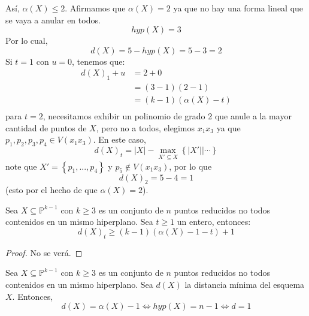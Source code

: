 \documentclass[12pt]{report}
\newcounter{it}
\theoremstyle{largebreak}
\newcommand\abs[1]{\ensuremath{\left|#1\right|}}
\begin{document}
\begin{exa}
        Así, $\alpha(X)\leq 2$. Afirmamos que $\alpha(X)=2$ ya que no hay una forma lineal que se vaya a anular en todos.
        \begin{equation*}
            hyp(X)=3
        \end{equation*}
        Por lo cual,
        \begin{equation*}
            d(X)=5-hyp(X)=5-3=2
        \end{equation*}
        Si $t=1$ con $u=0$, tenemos que:
        \begin{equation*}
            \begin{split}
                d(X)_1+u&=2+0\\
                &=(3-1)(2-1)\\
                &=(k-1)(\alpha(X)-t)\\
            \end{split}
        \end{equation*}
        para $t=2$, necesitamos exhibir un polinomio de grado 2 que anule a la mayor cantidad de puntos de $X$, pero no a todos, elegimos $x_1x_3$ ya que $p_1,p_2,p_3,p_4\in V(x_1x_3)$. En este caso,
        \begin{equation*}
            d(X)_t=\abs{X}-\max_{ X'\subseteq X}\left\{\abs{X'}\Big|\cdots \right\}
        \end{equation*}
        note que $X'=\left\{p_1,...,p_4 \right\}$ y $p_5\notin V(x_1x_3)$, por lo que
        \begin{equation*}
            d(X)_2=5-4=1
        \end{equation*}
        (esto por el hecho de que $\alpha(X)=2$).
    \end{exa}

    \begin{cor}
        Sea $X\subseteq\mathbb{P}^{ k-1}$ con $k\geq 3$ es un conjunto de $n$ puntos reducidos no todos contenidos en un mismo hiperplano. Sea $t\geq 1$ un entero, entonces:
        \begin{equation*}
            d(X)_t\geq(k-1)(\alpha(X)-1-t)+1
        \end{equation*} 
    \end{cor}

    \begin{proof}
        No se verá.
    \end{proof}

    \begin{cor}
        Sea $X\subseteq\mathbb{P}^{ k-1}$ con $k\geq 3$ es un conjunto de $n$ puntos reducidos no todos contenidos en un mismo hiperplano. Sea $d(X)$ la distancia mínima del esquema $X$. Entonces,
        \begin{equation*}
            d(X)=\alpha(X)-1\iff hyp(X)=n-1\iff d=1
        \end{equation*}
    \end{cor}
\end{document}

